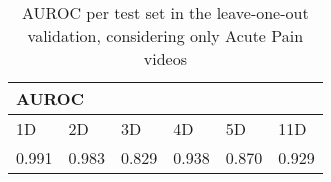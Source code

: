 \begin{table}[h!tp]
\centering
\caption{AUROC per test set in the leave-one-out validation, considering only Acute Pain videos}
\label{tab:auroc_leave_one_out}
\begin{tabular}{llllll}
\hline
\multicolumn{6}{l}{AUROC}                                                                                                                              \\ \hline
\multicolumn{1}{l|}{1D}    & \multicolumn{1}{l|}{2D}    & \multicolumn{1}{l|}{3D}    & \multicolumn{1}{l|}{4D}    & \multicolumn{1}{l|}{5D}    & 11D   \\ \hline
\multicolumn{1}{l|}{0.991} & \multicolumn{1}{l|}{0.983} & \multicolumn{1}{l|}{0.829} & \multicolumn{1}{l|}{0.938} & \multicolumn{1}{l|}{0.870} & 0.929 \\ \hline
\end{tabular}
\end{table}
